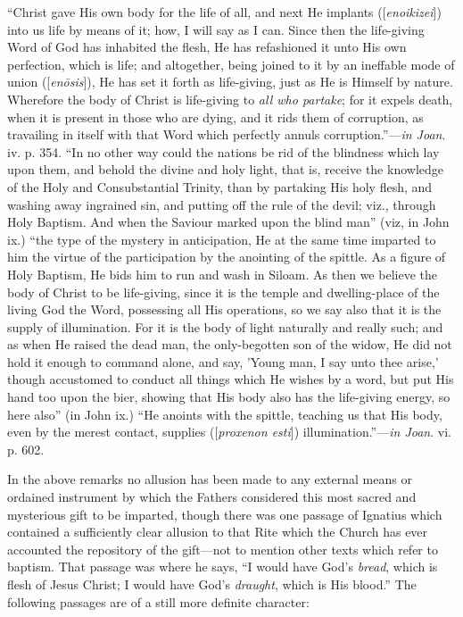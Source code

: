 ``Christ
gave His own body for the life of all, and next He implants ([\emph{enoikizei}])
into us life by means of it; how, I will say as I can. Since then the
life-giving Word of God has inhabited the flesh, He has refashioned it
unto His own perfection, which is life; and altogether, being joined
to it by an ineffable mode of union ([\emph{en\={o}sis}]), He has
set it forth as life-giving, just as He is Himself by nature.
Wherefore the body of Christ is life-giving to \emph{all who partake};
for it expels death, when it is present in those who are dying, and it
rids them of corruption, as travailing in itself with that Word which
perfectly annuls corruption.''—\emph{in Joan}. iv. p. 354. ``In no
other way could the nations be rid of the blindness which lay upon
them, and behold the divine and holy light, that
is, receive the knowledge of the Holy and Consubstantial Trinity, than
by partaking His holy flesh, and washing away ingrained sin, and
putting off the rule of the devil; viz., through Holy Baptism. And
when the Saviour marked upon the blind man'' (viz, in John ix.) ``the
type of the mystery in anticipation, He at the same time imparted to
him the virtue of the participation by the anointing of the spittle.
As a figure of Holy Baptism, He bids him to run and wash in Siloam. As
then we believe the body of Christ to be life-giving, since it is the
temple and dwelling-place of the living God the Word, possessing all
His operations, so we say also that it is the supply of illumination.
For it is the body of light naturally and really such; and as when He
raised the dead man, the only-begotten son of the widow, He did not
hold it enough to command alone, and say, 'Young man, I say unto thee
arise,' though accustomed to conduct all things which He wishes by a
word, but put His hand too upon the bier, showing that His body also
has the life-giving energy, so here also'' (in John ix.) ``He anoints
with the spittle, teaching us that His body, even by the merest
contact, supplies ([\emph{proxenon esti}]) illumination.''—\emph{in Joan}.
vi. p. 602.

In the above remarks no allusion has been made to
any external means or ordained instrument by which the Fathers
considered this most sacred and mysterious gift to be imparted, though
there was one passage of Ignatius which contained a sufficiently clear
allusion to that Rite which the Church has ever accounted the
repository of the gift—not to mention other texts which refer to
baptism. That passage was where he says, ``I would have God's \emph{bread},
which is flesh of Jesus Christ; I would have God's \emph{draught},
which is His blood.'' The following passages are of a still more
definite character:

